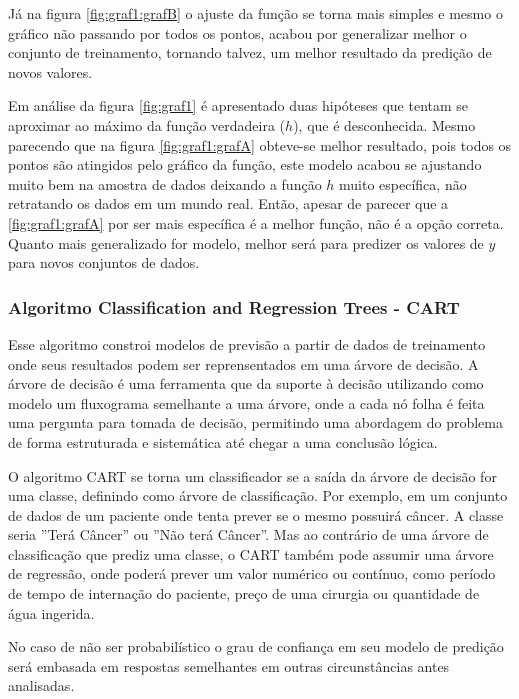 Já na figura \ref{fig:graf1:grafB} o ajuste da função se torna mais simples e mesmo o gráfico não passando por todos os pontos, acabou por generalizar melhor o conjunto de treinamento, tornando talvez, um melhor resultado da predição de novos valores. 

Em análise da figura \ref{fig:graf1} é apresentado duas hipóteses que tentam se aproximar ao máximo da função verdadeira (${h}$), que é desconhecida. Mesmo parecendo que  na figura \ref{fig:graf1:grafA} obteve-se melhor resultado, pois todos os pontos são atingidos pelo gráfico da função, este modelo acabou se ajustando muito bem na amostra de dados deixando a função ${h}$ muito específica, não retratando os dados em um mundo real. Então, apesar de parecer que a \ref{fig:graf1:grafA} por ser mais específica é a melhor função, não é a opção correta. Quanto mais  generalizado for modelo, melhor será para predizer os valores de ${y}$ para novos conjuntos de dados.

\subsubsection{Algoritmo Classification and Regression Trees  - CART}\label{cap:refTeor:sssec:cart}


Esse algoritmo constroi modelos de previsão a partir de dados de treinamento onde seus resultados podem ser reprensentados em uma árvore de decisão. A árvore de decisão é uma ferramenta que da suporte à decisão utilizando como modelo um fluxograma semelhante a uma árvore, onde a cada nó folha é feita uma pergunta para tomada de decisão, permitindo uma abordagem do problema de forma estruturada e sistemática até chegar a uma conclusão lógica.

O algoritmo CART se torna um classificador se a saída da árvore de decisão for uma classe, definindo como árvore de classificação. Por exemplo, em um conjunto de dados de um paciente onde tenta prever se o mesmo possuirá câncer. A classe seria ''Terá Câncer'' ou ''Não terá Câncer''. Mas ao contrário de uma árvore de classificação que prediz uma classe, o CART também pode assumir uma árvore de regressão, onde poderá prever um valor numérico ou contínuo, como período de tempo de internação do paciente, preço de uma cirurgia ou quantidade de água ingerida. 

No caso de não ser probabilístico o grau de confiança em seu modelo de predição será embasada em respostas semelhantes em outras circunstâncias antes analisadas. 


